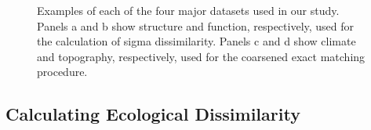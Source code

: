 \documentclass[
]{agujournal2019}
\begin{document}
\label{cell-fig-data}
\begin{figure}[H]


\caption{\label{fig-data}Examples of each of the four major datasets
used in our study. Panels a and b show structure and function,
respectively, used for the calculation of sigma dissimilarity. Panels c
and d show climate and topography, respectively, used for the coarsened
exact matching procedure.}

\end{figure}%

\subsection{Calculating Ecological Dissimilarity}\label{sec-sim}
\end{document}
